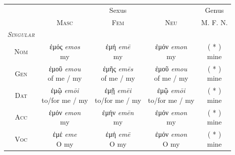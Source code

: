 \documentclass[10pt,a4paper,notitlepage]{article}
\newcommand{\tsc}[1]{\textsc{#1}}
\newcommand*{\grc}[1]{\fontspec{Inter}#1\rmfamily}
\newcommand{\trc}[1]{\textit{\fontspec{Tinos}#1}}
\begin{document}
    \begin{table}[H]
    \begin{tabular}{c|ccc|c}
        & \multicolumn{3}{c|}{Sexus} & Genus \\
        & \tsc{Masc} & \tsc{Fem} & \tsc{Neu} & \tsc{M. F. N.} \\
        \hline
        \emph{\tsc{Singular}} & & & & \\
        \tsc{Nom} & \makecell{\grc{ἐμός} \trc{emos} \\ \small my} & \makecell{\grc{ἐμή} \trc{emē} \\ \small my} & \makecell{\grc{ἐμόν} \trc{emon} \\ \small my} & \makecell{( * ) \\ \small mine} \\
        \tsc{Gen} & \makecell{\grc{ἐμοῦ} \trc{emou} \\ \small of me / my} & \makecell{\grc{ἐμῆς} \trc{emēs} \\ \small of me / my} & \makecell{\grc{ἐμοῦ} \trc{emou} \\ \small of me / my} & \makecell{( * ) \\ \small mine} \\
        \tsc{Dat} & \makecell{\grc{ἐμῷ} \trc{emōi} \\ \small to/for me / my} & \makecell{\grc{ἐμῇ} \trc{emēi} \\ \small to/for me / my} & \makecell{\grc{ἐμῷ} \trc{emōi} \\ \small to/for me / my} & \makecell{( * ) \\ \small mine} \\
        \tsc{Acc} & \makecell{\grc{ἐμόν} \trc{emon} \\ \small my} & \makecell{\grc{ἐμήν} \trc{emēn} \\ \small my} & \makecell{\grc{ἐμόν} \trc{emon} \\ \small my} & \makecell{( * ) \\ \small mine} \\
        \tsc{Voc} & \makecell{\grc{ἐμέ} \trc{eme} \\ \small O my} & \makecell{\grc{ἐμή} \trc{emē} \\ \small O my} & \makecell{\grc{ἐμόν} \trc{emon} \\ \small O my} & \makecell{( * ) \\ \small mine} \\


\end{tabular}
\end{table}
\end{document}
